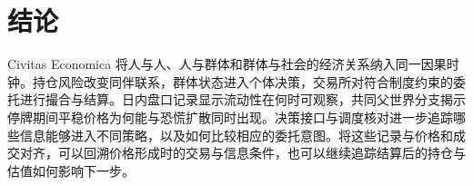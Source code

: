 \section{结论}
\label{sec:conclusion}

Civitas Economica 将人与人、人与群体和群体与社会的经济关系纳入同一因果时钟。持仓风险改变同伴联系，群体状态进入个体决策，交易所对符合制度约束的委托进行撮合与结算。日内盘口记录显示流动性在何时可观察，共同父世界分支揭示停牌期间平稳价格为何能与恐慌扩散同时出现。决策接口与调度核对进一步追踪哪些信息能够进入不同策略，以及如何比较相应的委托意图。将这些记录与价格和成交对齐，可以回溯价格形成时的交易与信息条件，也可以继续追踪结算后的持仓与估值如何影响下一步。
